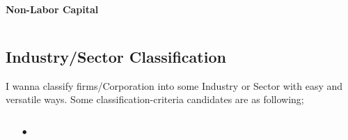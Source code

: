 \documentclass[aspectratio=169, dvipdfmx, 11pt]{beamer}
\begin{document}
\begin{frame}
\begin{columns}
\begin{column}{0.44\textwidth}
\begin{center}
                \begin{classify}{\textbf{\Large \color{blue}Non-Labor Capital}}
                \end{classify}
            \end{center}
        \end{column}
    \end{columns}
\end{frame}

\subsection{Industry/Sector Classification}
\begin{frame}
    I wanna classify firms/Corporation into some Industry or Sector with easy and versatile ways. Some classification-criteria candidates are as following;\\
    \vspace{8mm}
    \hyperlink{https://www.spglobal.com/spdji/jp/landing/topic/gics/}{}\\
    \begin{itemize}
        \item[$\bullet$] \hyperlink{https://www.jpx.co.jp/markets/indices/carbon-efficient/nlsgeu000003b0r8-att/sp-jpx-carbon-efficient-index-constituent-report.pdf}{}
    \end{itemize}
    \vspace{6mm}
    \hyperlink{https://www.nikkei.com/telecom/industry_l}{}\\
    \vspace{6mm}
    \hyperlink{https://www.soumu.go.jp/toukei_toukatsu/index/seido/sangyo/02toukatsu01_03000044.html}{}\\
    \vspace{6mm}
    \hyperlink{https://management-accounting.biz/industry-type-2/}{}
\end{frame}
\end{document}
